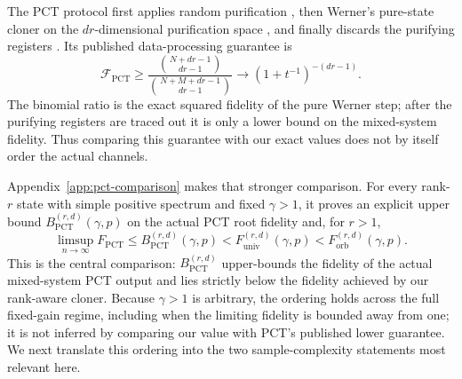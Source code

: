 \documentclass[11pt]{article}
\theoremstyle{remark}
\theoremstyle{plain}
\newcommand{\Forb}{F_{\mathrm{orb}}}
\newcommand{\Funiv}{F_{\mathrm{univ}}}
\begin{document}
The PCT protocol first applies random purification
\cite{TangWrightZhandry2025}, then Werner's pure-state cloner on the
\(dr\)-dimensional purification space \cite{Werner1998}, and finally
discards the purifying registers
\cite{LiTheilHarrowChuang2026,
FanizzaGrinkoScharnhorstSpilecki2026,JeonSohnOh2026}.  Its published
data-processing guarantee is
\[
  \mathcal F_{\mathrm{PCT}}
  \ge
  \frac{\binom{N+dr-1}{dr-1}}
       {\binom{N+M+dr-1}{dr-1}}
  \longrightarrow
  (1+t^{-1})^{-(dr-1)}.
\]
The binomial ratio is the exact squared fidelity of the pure Werner step;
after the purifying registers are traced out it is only a lower bound on the
mixed-system fidelity.  Thus comparing this guarantee with our exact values
does not by itself order the actual channels.

Appendix~\ref{app:pct-comparison} makes that stronger comparison.  For every
rank-\(r\) state with simple positive spectrum and fixed \(\gamma>1\), it
proves an explicit upper bound
\(B_{\mathrm{PCT}}^{(r,d)}(\gamma,p)\) on the actual PCT root fidelity and,
for \(r>1\),
\[
  \limsup_{n\to\infty}F_{\mathrm{PCT}}
  \le B_{\mathrm{PCT}}^{(r,d)}(\gamma,p)
  <\Funiv^{(r,d)}(\gamma,p)<\Forb^{(r,d)}(\gamma,p).
\]
This is the central comparison: \(B_{\mathrm{PCT}}^{(r,d)}\) upper-bounds
the fidelity of the actual mixed-system PCT output and lies strictly below
the fidelity achieved by our rank-aware cloner.  Because \(\gamma>1\) is
arbitrary, the ordering holds across the full fixed-gain regime, including
when the limiting fidelity is bounded away from one; it is not inferred by
comparing our value with PCT's published lower guarantee.  We next translate
this ordering into the two sample-complexity statements most relevant here.
\end{document}
